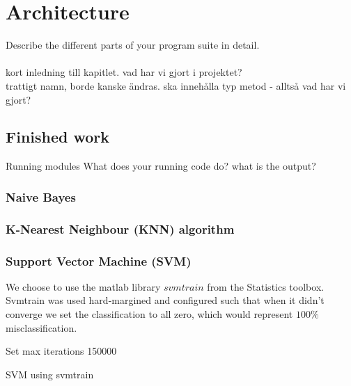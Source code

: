 \chapter{Architecture}
Describe the different parts of your program suite in detail.
\\\\
kort inledning till kapitlet. vad har vi gjort i projektet?\\
trattigt namn, borde kanske ändras. ska innehålla typ metod - alltså vad har vi gjort?

\section{Finished work}
Running modules
What does your running code do? what is the output?

\subsection{Naive Bayes}

\subsection{K-Nearest Neighbour (KNN) algorithm}

\subsection{Support Vector Machine (SVM)}
We choose to use the matlab library $svmtrain$ \citep{svmtrain_ref} from the Statistics toolbox. Svmtrain was used hard-margined and configured such that when it didn't converge we set the classification to all zero, which would represent $100\%$ misclassification. \\
\begin{algorithm}[H]
\label{algorithm:SVM}
\SetAlgoLined
{}

Set max iterations 150000 \\
 \caption{SVM using svmtrain}
\end{algorithm}



